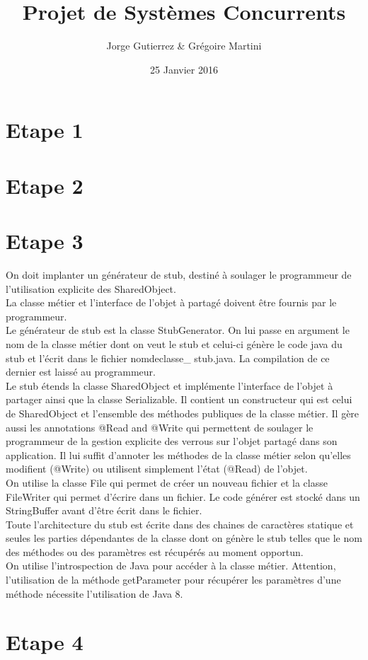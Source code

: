 \documentclass[a4paper,12pt]{article}
\title{Projet de Systèmes Concurrents}
\author{Jorge Gutierrez \& Grégoire Martini}
\date{25 Janvier 2016}
\begin{document}
\maketitle
\tableofcontents
\newpage


\section{Etape 1}


\section{Etape 2}


\section{Etape 3}

On doit  implanter un générateur de stub, destiné à soulager le programmeur de l'utilisation explicite des SharedObject. \\

La classe métier et l'interface de l'objet à partagé doivent être fournis par le programmeur.\\
Le générateur de stub est la classe StubGenerator. On lui passe en argument le nom de la classe métier dont on veut le stub et celui-ci génère le code java du stub et l'écrit dans le fichier nomdeclasse\_ stub.java. La compilation de ce dernier est laissé au programmeur.\\

Le stub étends la classe SharedObject et implémente l'interface de l'objet à partager ainsi que la classe Serializable.
Il contient un constructeur qui est celui de SharedObject et l'ensemble des méthodes publiques de la classe métier.
Il gère aussi les annotations @Read and @Write qui permettent de soulager le programmeur de la gestion explicite des verrous sur l'objet partagé dans son application. Il lui suffit d'annoter les méthodes de la classe métier selon qu'elles modifient (@Write) ou utilisent simplement l'état (@Read) de l'objet. \\

On utilise la classe File qui permet de créer un nouveau fichier et la classe FileWriter qui permet d'écrire dans un fichier. Le code générer est stocké dans un StringBuffer avant d'être écrit dans le fichier.\\
Toute l'architecture du stub est écrite dans des chaines de caractères statique et seules les parties dépendantes de la classe dont on génère le stub telles que le nom des méthodes ou des paramètres est récupérés au moment opportun.\\
 On utilise l'introspection de Java pour accéder à la classe métier. Attention, l'utilisation de la méthode getParameter pour récupérer les paramètres d'une méthode nécessite l'utilisation de Java 8.


\section{Etape 4}
\end{document}
